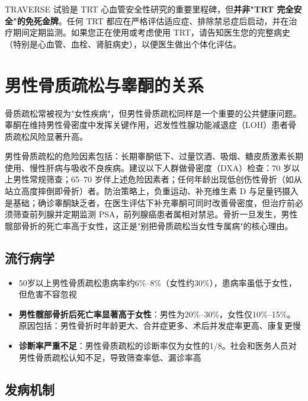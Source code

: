 \begin{tcolorbox}[colback=pink!5!white,colframe=red!50!black,title=贴心小叮咛]
TRAVERSE 试验是 TRT 心血管安全性研究的重要里程碑，但\textbf{并非"TRT 完全安全"的免死金牌}。任何 TRT 都应在严格评估适应症、排除禁忌症后启动，并在治疗期间定期监测。如果您正在使用或考虑使用 TRT，请告知医生您的完整病史（特别是心血管、血栓、肾脏病史），以便医生做出个体化评估。
\end{tcolorbox}

\section{男性骨质疏松与睾酮的关系}

骨质疏松常被视为"女性疾病"，但男性骨质疏松同样是一个重要的公共健康问题。睾酮在维持男性骨密度中发挥关键作用，迟发性性腺功能减退症（LOH）患者骨质疏松风险显著升高。


男性骨质疏松的危险因素包括：长期睾酮低下、过量饮酒、吸烟、糖皮质激素长期使用、慢性肝病与吸收不良疾病。建议以下人群做骨密度（DXA）检查：70 岁以上男性常规筛查；65--70 岁伴上述危险因素者；任何年龄出现低创伤性骨折（如从站立高度摔倒即骨折）者。防治策略上，负重运动、补充维生素 D 与足量钙摄入是基础；确诊睾酮缺乏者，在医生评估下补充睾酮可同时改善骨密度，但治疗前必须筛查前列腺并定期监测 PSA，前列腺癌患者属相对禁忌。骨折一旦发生，男性髋部骨折的死亡率高于女性，这正是"别把骨质疏松当女性专属病"的核心理由。

\subsection{流行病学}

\begin{itemize}[leftmargin=2cm]
	\item 50岁以上男性骨质疏松患病率约6\%--8\%（女性约30\%），患病率虽低于女性，但危害不容忽视
	\item \textbf{男性髋部骨折后死亡率显著高于女性}：男性为20\%--30\%，女性仅10\%--15\%。原因包括：男性骨折时年龄更大、合并症更多、术后并发症率更高、康复更慢
	\item \textbf{诊断率严重不足}：男性骨质疏松的诊断率仅为女性的1/8。社会和医务人员对男性骨质疏松认知不足，导致筛查率低、漏诊率高
\end{itemize}

\subsection{发病机制}


